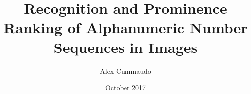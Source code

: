 \title{Recognition and Prominence Ranking of Alphanumeric Number Sequences in Images}
\author{Alex Cummaudo}
\date{October 2017}

\def \thesupervisor {Prof. Rajesh Vasa, Assoc. Prof. Andrew Cain}
\def \thedegree {Bachelor of Information Technology (Honours)}
\def \theinstitution {Deakin Software and Technology Innovation Laboratory\\School of Information Technology\\Deakin University, Australia}
\def \theauthorspostnominals {BSc \textit{Swinburne}}